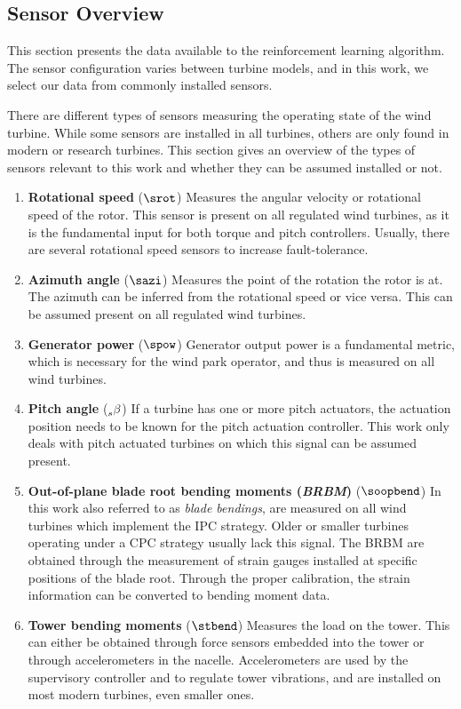 \subsection{Sensor Overview}

\begin{summary}
This section presents the data available to the reinforcement learning algorithm. The sensor configuration varies between turbine models, and in this work, we select our data from commonly installed sensors.
\end{summary}

There are different types of sensors measuring the operating state of the wind turbine. While some sensors are installed in all turbines, others are only found in modern or research turbines. This section gives an overview of the types of sensors relevant to this work and whether they can be assumed installed or not.

\begin{enumerate}
  \item \textbf{Rotational speed} ($\srot$) Measures the angular velocity or rotational speed of the rotor. This sensor is present on all regulated wind turbines, as it is the fundamental input for both torque and pitch controllers. Usually, there are several rotational speed sensors to increase fault-tolerance.
  \item \textbf{Azimuth angle} ($\sazi$) Measures the point of the rotation the rotor is at. The azimuth can be inferred from the rotational speed or vice versa. This can be assumed present on all regulated wind turbines.
  \item \textbf{Generator power} ($\spow$) Generator output power is a fundamental metric, which is necessary for the wind park operator, and thus is measured on all wind turbines.
  \item \textbf{Pitch angle} ($\prescript{}{s}{\beta}$) If a turbine has one or more pitch actuators, the actuation position needs to be known for the pitch actuation controller. This work only deals with pitch actuated turbines on which this signal can be assumed present.
  \item \textbf{Out-of-plane blade root bending moments (\textit{\acs{BRBM}})} ($\soopbend$) In this work also referred to as \textit{blade bendings}, are measured on all wind turbines which implement the \ac{IPC} strategy. Older or smaller turbines operating under a \ac{CPC} strategy usually lack this signal. The \ac{BRBM} are obtained through the measurement of strain gauges installed at specific positions of the blade root. Through the proper calibration, the strain information can be converted to bending moment data. 
  \item \textbf{Tower bending moments} ($\stbend$) Measures the load on the tower. This can either be obtained through force sensors embedded into the tower or through accelerometers in the nacelle. Accelerometers are used by the supervisory controller and to regulate tower vibrations, and are installed on most modern turbines, even smaller ones.
\end{enumerate}

